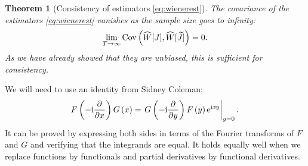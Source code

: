 \documentclass[12pt]{article}
\theoremstyle{slplain}
\newtheorem{thm}{Theorem}
\theoremstyle{sldefinition}
\theoremstyle{remark}
\newcommand{\tj}{\widetilde{J}}
\newcommand{\hw}{\widehat{W}}
\begin{document}
\begin{thm}[Consistency of estimators \eqref{eq:wienerest}] \label{th:wienercons}
  The covariance of the estimators \eqref{eq:wienerest} vanishes as the sample size goes to infinity:
  \begin{equation}\label{eq:wienercons}
    \lim_{T\to\infty} \cov\prn{ \hw[J], \hw[\tj] } = 0.
  \end{equation}
  As we have already showed that they are unbiased, this is sufficient for consistency.
\end{thm}
%
We will need to use an identity from Sidney Coleman:
%
\begin{equation}\label{eq:coleman}
  F\prn{-\ir\pdiff{}{x}} G\prn{x} = \left. G\prn{-\ir\pdiff{}{y}} F\prn{y} \e^{\ir x \cdt y} \right|_{y=0}.
\end{equation}
%
It can be proved by expressing both sides in terms of the Fourier transforms of $F$ and $G$ and verifying that the integrands are equal. It holds equally well when we replace functions by functionals and partial derivatives by functional derivatives.
%
\end{document}
